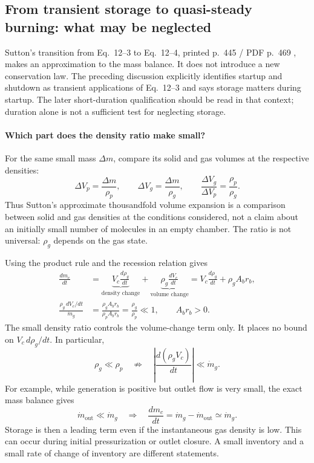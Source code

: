 \subsection{From transient storage to quasi-steady burning: what may be neglected}
\label{sec:sb-storage-approximation}
Sutton's transition from Eq.~12--3 to Eq.~12--4, printed
p.~445 / PDF p.~469 \cite{sutton}, makes an approximation to the
mass balance. It does not introduce a new conservation law.
The preceding discussion explicitly identifies startup and shutdown as
transient applications of Eq.~12--3 and says storage matters during
startup. The later short-duration qualification should be read in that
context; duration alone is not a sufficient test for neglecting storage.

\paragraph{Which part does the density ratio make small?}
For the same small mass $\Delta m$, compare its solid and gas volumes
at the respective densities:
\[
 \Delta V_p=\frac{\Delta m}{\rho_p},\qquad
 \Delta V_g=\frac{\Delta m}{\rho_g},\qquad
 \frac{\Delta V_g}{\Delta V_p}=\frac{\rho_p}{\rho_g}.
\]
Thus Sutton's approximate thousandfold volume expansion is a comparison
between solid and gas densities at the conditions considered, not a
claim about an initially small number of molecules in an empty chamber.
The ratio is not universal: $\rho_g$ depends on the gas state.

Using the product rule and the recession relation gives
\begin{align}
 \frac{dm_c}{dt}
 &=\underbrace{V_c\frac{d\rho_g}{dt}}_{\text{density change}}
   +\underbrace{\rho_g\frac{dV_c}{dt}}_{\text{volume change}}
   =V_c\frac{d\rho_g}{dt}+\rho_g A_b r_b,
   \label{eq:sb-storage-two-terms}\\
 \frac{\rho_g\,dV_c/dt}{\dot m_g}
 &=\frac{\rho_g A_b r_b}{\rho_p A_b r_b}
   =\frac{\rho_g}{\rho_p}\ll1,
   \qquad A_b r_b>0.
   \label{eq:sb-volume-storage-ratio}
\end{align}
The small density ratio controls the volume-change term only.
It places no bound on $V_c\,d\rho_g/dt$. In particular,
\[
 \rho_g\ll\rho_p
 \quad\not\Longrightarrow\quad
 \left|\frac{d(\rho_gV_c)}{dt}\right|\ll\dot m_g.
\]
For example, while generation is positive but outlet flow is very small,
the exact mass balance gives
\[
 \dot m_{\mathrm{out}}\ll\dot m_g
 \quad\Longrightarrow\quad
 \frac{dm_c}{dt}
 =\dot m_g-\dot m_{\mathrm{out}}\simeq\dot m_g.
\]
Storage is then a leading term even if the instantaneous gas density is
low. This can occur during initial pressurization or outlet closure.
A small inventory and a small rate of change of inventory are different
statements.

